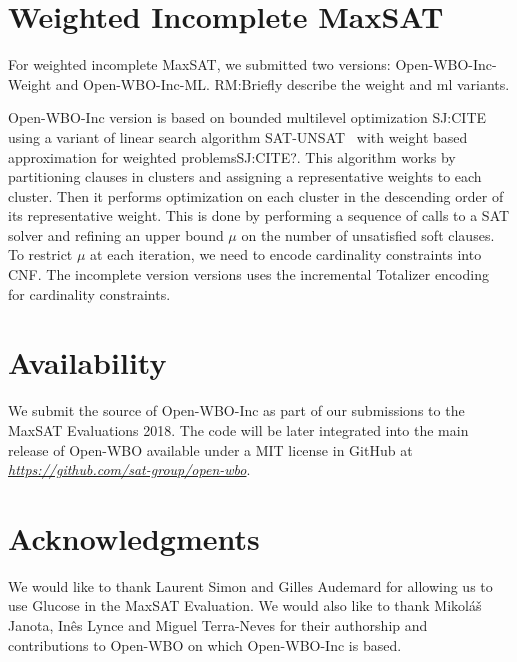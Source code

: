 \documentclass[conference]{IEEEtran}
\newcommand{\sjcomment}[1]{\textcolor{sjcolor}{SJ:#1}}
\newcommand{\rmcomment}[1]{\textcolor{rmcolor}{RM:#1}}
\newcommand{\toolname}{\textsf{Open-WBO-Inc}\xspace}
\newcommand{\weight}{\textsf{Open-WBO-Inc-Weight}\xspace}
\newcommand{\ml}{\textsf{Open-WBO-Inc-ML}\xspace}
\begin{document}
\section{Weighted Incomplete MaxSAT}

For weighted incomplete MaxSAT, we submitted two versions: \weight and \ml. \rmcomment{Briefly describe the weight and ml variants.}

\toolname version is based on bounded multilevel optimization \sjcomment{CITE} using a variant of linear search algorithm SAT-UNSAT~\cite{berre-jsat10} with weight based approximation for weighted problems\sjcomment{CITE?}. This algorithm works by partitioning clauses in clusters and assigning a representative weights to each cluster. Then it performs optimization on each cluster in the descending order of its representative weight. This is done by performing a sequence of calls to a SAT solver and refining an upper bound $\mu$ on the number of unsatisfied soft clauses. To restrict $\mu$ at each iteration, we need to encode  cardinality constraints into CNF. The incomplete version versions uses the incremental Totalizer encoding~\cite{martins-cp14} for cardinality constraints.
 

\section{Availability}

We submit the source of \toolname as part of our submissions to the MaxSAT Evaluations 2018. The code will be later integrated into the main release of \textsf{Open-WBO} available under a MIT license in GitHub at \emph{\url{https://github.com/sat-group/open-wbo}}.

\section*{Acknowledgments}

We would like to thank Laurent Simon and Gilles Audemard for
allowing us to use Glucose in the MaxSAT Evaluation. We
would also like to thank Mikol{\'a}{\v{s}} Janota,  In\^es Lynce and Miguel
Terra-Neves for their authorship and contributions to
\textsf{Open-WBO} on which \toolname is based.

\balance




\end{document}
